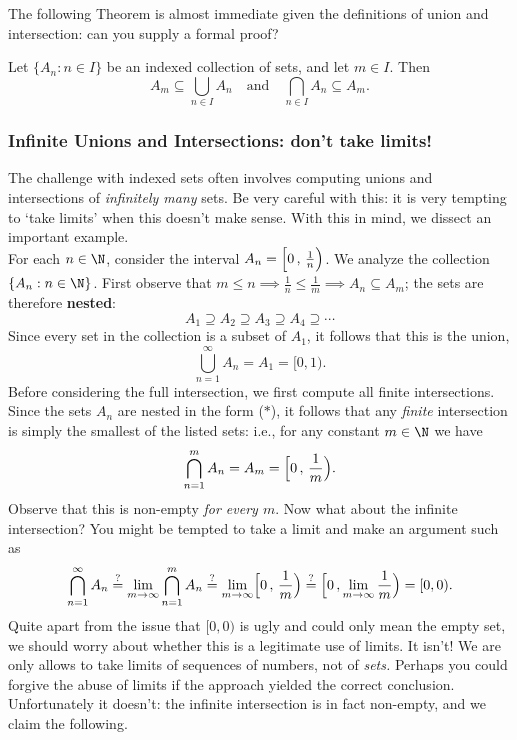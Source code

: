 \noindent The following Theorem is almost immediate given the definitions of union and intersection: can you supply a formal proof?

\begin{thm}
Let $\{A_n:n\in I\}$ be an indexed collection of sets, and let $m\in I$. Then
\[A_m\subseteq\bigcup_{n\in I}A_n\quad\text{and}\quad \bigcap_{n\in I}A_n\subseteq A_m.\]
\end{thm}





\subsubsection*{Infinite Unions and Intersections: don't take limits!}

The challenge with indexed sets often involves computing unions and intersections of \emph{infinitely many} sets. Be very careful with this: it is very tempting to `take limits' when this doesn't make sense. With this in mind, we dissect an important example.\\

\noindent For each $n\in\N$, consider the interval $A_n=\Bigl[0\,,\,\frac 1n\Bigr)$. We analyze the collection $\{A_n:n\in\N\}$. First observe that $m\le n\implies \frac 1n\le \frac 1m\implies A_n\subseteq A_m$; the sets are therefore \textbf{nested}:
\[A_1\supseteq A_2\supseteq A_3\supseteq A_4\supseteq\cdots\tag*{($\ast$)}\]
Since every set in the collection is a subset of $A_1$, it follows that this is the union,
\[\bigcup_{n=1}^\infty A_n=A_1=[0,1).\]
Before considering the full intersection, we first compute all finite intersections. Since the sets $A_n$ are nested in the form ($\ast$), it follows that any \emph{finite} intersection is simply the smallest of the listed sets: i.e., for any constant $m\in\N$ we have
\[\bigcap_{n=1}^mA_n=A_m=\Bigl[0\,,\,\frac 1m\Bigr).\]
Observe that this is non-empty \emph{for every $m$}. Now what about the infinite intersection? You might be tempted to take a limit and make an argument such as
\[\bigcap\limits_{n=1}^\infty A_n\overset{?}{=}\lim_{m\to\infty}\bigcap_{n=1}^mA_n\overset{?}{=}\lim_{m\to\infty}\Bigl[0\,,\,\frac 1m\Bigr)\overset{?}{=}\Bigl[0\,,\lim_{m\to\infty}\frac 1m\Bigr)=[0,0).\]
Quite apart from the issue that $[0,0)$ is ugly and could only mean the empty set, we should worry about whether this is a legitimate use of limits. It isn't! We are only allows to take limits of sequences of numbers, not of \emph{sets.} Perhaps you could forgive the abuse of limits if the approach yielded the correct conclusion. Unfortunately it doesn't: the infinite intersection is in fact non-empty, and we claim the following.

